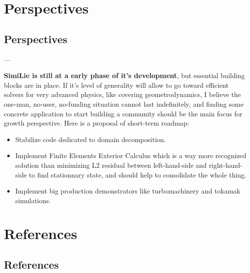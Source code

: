 \documentclass[9pt, svgnames, aspectratio=32, handout]{beamer}
\newenvironment{tframe}[1][]{%
  \begin{frame}[fragile,environment=tframe]{%
    \normalsize{{\bfseries \secname} --- \small{\subsecname} #1}%
  }%
}{%
  \end{frame}%
}
\begin{document}
\section{Perspectives}

\subsection{Perspectives}

\begin{tframe}

\textbf{SimiLie is still at a early phase of it's development}, but essential building blocks are in place. If it's level of generality will allow to go toward efficient solvers for very advanced physics, like covering geometrodynamics, I believe the one-man, no-user, no-funding situation cannot last indefinitely, and finding some concrete application to start building a community should be the main focus for growth perspective. Here is a proposal of short-term roadmap:

\begin{itemize}
\item Stabilize code dedicated to domain decomposition.
\item Implement Finite Elements Exterior Calculus which is a way more recognized solution than minimizing L2 residual between left-hand-side and right-hand-side to find stationnary state, and should help to consolidate the whole thing.
\item Implement big production demonstrators like turbomachinery and tokamak simulations.
\end{itemize}

\end{tframe}

\appendix

\section{References}

\subsection*{References}
\end{document}
